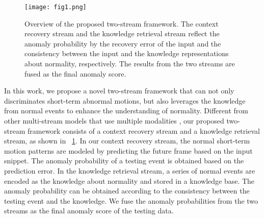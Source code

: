 \documentclass[lettersize,journal]{IEEEtran}
\begin{document}
\begin{figure}[!t]
	\centering
	\texttt{[image: fig1.png]}
	\caption{Overview of the proposed two-stream framework.
	The context recovery stream and the knowledge retrieval stream reflect the anomaly probability by the recovery error of the input and the consistency between the input and the knowledge representations about normality, respectively.
	The results from the two streams are fused as the final anomaly score.
}
	\label{fig1}
\end{figure}

In this work, we propose a novel two-stream framework that can not only discriminates short-term abnormal motions, but also leverages the knowledge from normal events to enhance the understanding of normality.
Different from other multi-stream models that use multiple modalities \cite{HierarchicalSpatioTemporal2021zeng, VariationalAbnormal2022li, FutureFrame2021luo, BackgroundAgnosticFramework2021georgescua}, our proposed two-stream framework consists of a context recovery stream and a knowledge retrieval stream, as shown in \figurename~\ref{fig1}.
In our context recovery stream, the normal short-term motion patterns are modeled by predicting the future frame based on the input snippet.
The anomaly probability of a testing event is obtained based on the prediction error.
In the knowledge retrieval stream, a series of normal events are encoded as the knowledge about normality and stored in a knowledge base.
The anomaly probability can be obtained according to the consistency between the testing event and the knowledge.
We fuse the anomaly probabilities from the two streams as the final anomaly score of the testing data.
\end{document}
